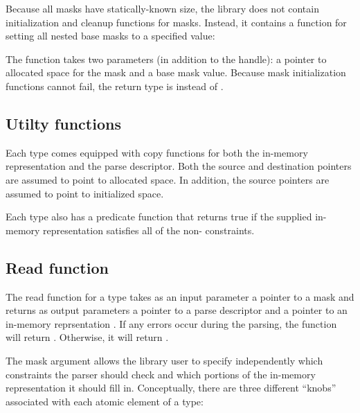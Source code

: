 
Because all masks have statically-known size, the library does not
contain initialization and cleanup functions for masks.  
Instead, it contains a function for setting all nested base masks 
to a specified value:  


The function takes two parameters (in
addition to the \pads{} handle): a pointer to allocated space for the
mask and a base mask value.  Because mask initialization
functions cannot fail, the return type is  instead of
. 

\subsection{Utilty functions}
Each type  comes equipped with copy functions for both the
in-memory representation and the parse descriptor.  Both the source
and destination pointers are assumed to point to allocated space.  In
addition, the source pointers are assumed to point to initialized
space.


\noindent
Each type  also has a predicate function that returns true if
the supplied in-memory representation satisfies all of the
non-\pparsecheck{} constraints.



\subsection{Read function}
\label{sec:common-features-read-function}
The read function for a \pads{} type  takes as an input parameter a
pointer to a mask  and returns as output parameters a pointer to
a parse descriptor  and a pointer to an in-memory
reprsentation .  If any errors occur during the parsing,
the function will return .  Otherwise, it
will return .  


The mask argument allows the library user to specify independently
which constraints the parser should check and which portions of the
in-memory representation it should fill in.  Conceptually, there are
three different ``knobs'' associated with each atomic element of a
\pads{} type:

